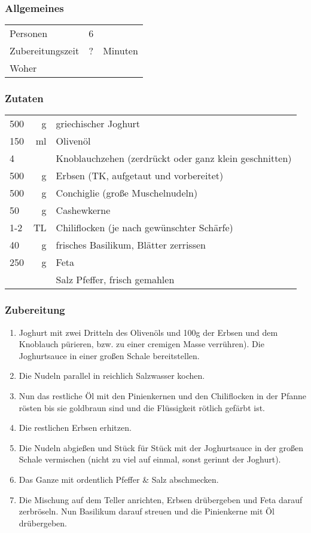 \subsubsection*{Allgemeines}
\begin{tabular}{lrl}
    Personen         &   6 &  \\
    Zubereitungszeit &   ? & Minuten \\
    Woher & &\cite[vgl.][]{OttoLenghiJerusalem}
\end{tabular} 

\subsubsection*{Zutaten}
\begin{tabular}{lrl}
    500 &  g & griechischer Joghurt                                   \\
    150 & ml & Olivenöl                                               \\
    4   &    & Knoblauchzehen (zerdrückt oder ganz klein geschnitten) \\
    500 &  g & Erbsen (TK, aufgetaut und vorbereitet)                 \\
    500 &  g & Conchiglie (große Muschelnudeln)                       \\
    50  &  g & Cashewkerne                                            \\
    1-2 & TL & Chiliflocken (je nach gewünschter Schärfe)             \\
    40  &  g & frisches Basilikum, Blätter zerrissen                  \\
    250 &  g & Feta                                                   \\
    &    & Salz Pfeffer, frisch gemahlen
\end{tabular} 
\subsubsection*{Zubereitung}
\begin{enumerate}
    \item Joghurt mit zwei Dritteln des Olivenöls und 100g der Erbsen und dem Knoblauch pürieren, bzw. zu einer cremigen Masse verrühren). Die Joghurtsauce in einer großen Schale bereitstellen.
    \item Die Nudeln parallel in reichlich Salzwasser kochen.
    \item Nun das restliche Öl mit den Pinienkernen und den Chiliflocken in der Pfanne rösten bis sie goldbraun sind und die Flüssigkeit rötlich gefärbt ist.
    \item Die restlichen Erbsen erhitzen.
    \item Die Nudeln abgießen und Stück für Stück mit der Joghurtsauce in der großen Schale vermischen (nicht zu viel auf einmal, sonst gerinnt der Joghurt).
    \item Das Ganze mit ordentlich Pfeffer \& Salz abschmecken.
    \item Die Mischung auf dem Teller anrichten, Erbsen drübergeben und Feta darauf zerbröseln. Nun Basilikum darauf streuen und die Pinienkerne mit Öl drübergeben.
\end{enumerate}


